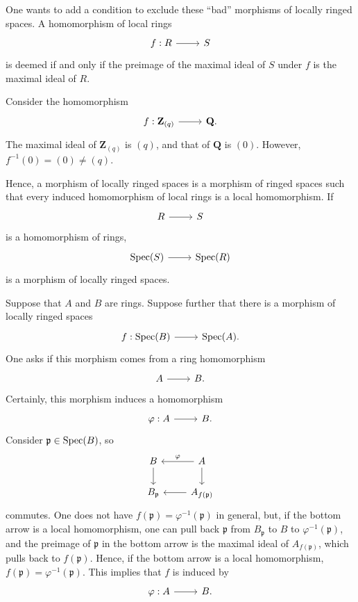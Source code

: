 \documentclass [11 pt, oneside] {article}
\begin{document}
One wants to add a condition to exclude these ``bad'' morphisms of locally ringed spaces. A homomorphism of local rings 
\[
\begin{tikzcd}
f:R\ar[r]&S
\end{tikzcd}
\] 
is deemed  if and only if the preimage of the maximal ideal of $S$ under $f$ is the maximal ideal of $R$.

\begin{example}\label{}\text{}
Consider the homomorphism 
\[
\begin{tikzcd}
f:\Z_{(q)}\ar[r]&\Q.
\end{tikzcd}
\] 
The maximal ideal of $ \mathbf{Z}_{(q)}$ is $(q)$, and that of $\mathbf{Q}$ is $(0)$. However, $f^{-1}(0)=  (0)\ne  (q)$. 
\end{example}

Hence, a morphism of locally ringed spaces is a morphism of ringed spaces such that every induced homomorphism of local rings is a local homomorphism. If 
\[
\begin{tikzcd}
R\ar[r]&S
\end{tikzcd}
\] 
is a homomorphism of rings,
\[
\begin{tikzcd}
\Spec(S)\ar[r]&\Spec(R)
\end{tikzcd}
\] 
is a morphism of locally ringed spaces.

Suppose that $A$ and $B$ are rings. Suppose further that there is a morphism of locally ringed spaces 
\[
\begin{tikzcd}
f:\Spec(B)\ar[r]&\Spec(A).
\end{tikzcd}
\] 
One asks if this morphism comes from a ring homomorphism 
\[
\begin{tikzcd}
A\ar[r]&B.
\end{tikzcd}
\] 
Certainly, this morphism induces a homomorphism 
\[
\begin{tikzcd}
\varphi:A\ar[r]&B.
\end{tikzcd}
\]  
Consider $\mathfrak{p}\in \operatorname{Spec} (B)$, so
\[
\begin{tikzcd}
	B \ar[d] & A \ar[l,"\varphi", swap] \ar[d] \\ B_{\mathfrak{p}} &A_{f(\mathfrak{p}) } \ar[l]
\end{tikzcd}
\]
commutes.
One does not have $f(\mathfrak{p}) = \varphi ^{-1}(\mathfrak{p})$ in general, but, if the bottom arrow is a local homomorphism, one can pull back $\mathfrak{p}$ from $B_{\mathfrak{p}}$ to $B$ to $\varphi^{-1}(\mathfrak{p})$, and the preimage of $\mathfrak{p}$ in the bottom arrow is the maximal ideal of $A_{f(\mathfrak{p}) }$, which pulls back to $f(\mathfrak{p})$. Hence, if the bottom arrow is a local homomorphism, $f(\mathfrak{p}) = \varphi^{-1}(\mathfrak{p})$. This implies that $f$ is induced by 
\[
\begin{tikzcd}
\varphi:A\ar[r]&B.
\end{tikzcd}
\]
\end{document}
